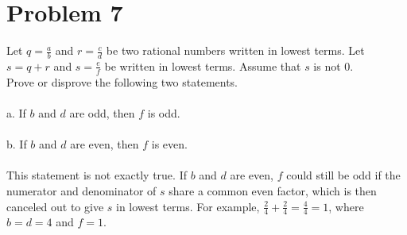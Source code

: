 \documentclass{amsart}
\theoremstyle{definition}
\theoremstyle{Exercise}
\theoremstyle{remark}
\theoremstyle{rule}
\numberwithin{equation}{section}
\begin{document}
\section*{Problem 7}

Let $\displaystyle q = \frac{a}{b}$ and $\displaystyle r = \frac{c}{d}$ be two rational numbers written in lowest terms. Let $s = q + r$ and $\displaystyle s = \frac{e}{f}$ be written in lowest terms. Assume that $s$ is not $0$.\\

Prove or disprove the following two statements.
\\\\
a.  If $b$ and $d$ are odd, then $f$ is odd.
\\\\
b. If $b$ and $d$ are even, then $f$ is even.
\\\\
This statement is not exactly true. If \( b \) and \( d \) are even, \( f \) could still be odd if the numerator and denominator of \( s \) share a common even factor, which is then canceled out to give \( s \) in lowest terms. For example, \( \frac{2}{4} + \frac{2}{4} = \frac{4}{4} = 1 \), where \( b = d = 4 \) and \( f = 1 \).
\\\\


\newpage
\end{document}

